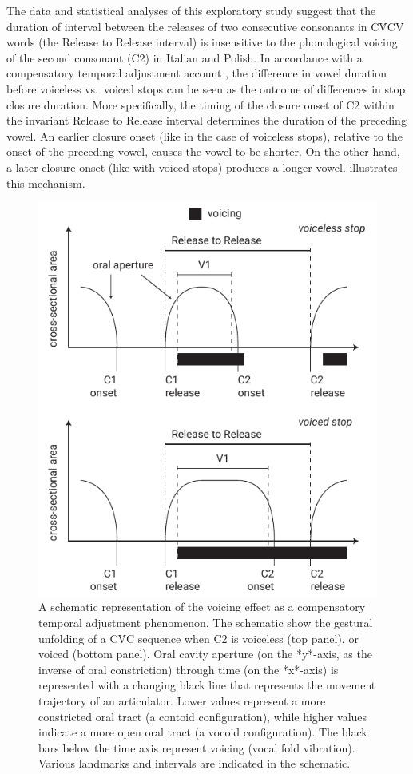 \documentclass[preprint]{JASAnew}
\begin{document}
The data and statistical analyses of this exploratory study suggest that
the duration of interval between the releases of two consecutive
consonants in CV́CV words (the Release to Release interval) is
insensitive to the phonological voicing of the second consonant (C2) in
Italian and Polish. In accordance with a compensatory temporal
adjustment account \citep{slis1969, lehiste1970}, the difference in
vowel duration before voiceless vs.~voiced stops can be seen as the
outcome of differences in stop closure duration. More specifically, the
timing of the closure onset of C2 within the invariant Release to
Release interval determines the duration of the preceding vowel. An
earlier closure onset (like in the case of voiceless stops), relative to
the onset of the preceding vowel, causes the vowel to be shorter. On the
other hand, a later closure onset (like with voiced stops) produces a
longer vowel.  illustrates this mechanism.

\begin{figure}
  \includegraphics{img/compensatory.pdf}
  \caption{A schematic representation of the voicing effect as a compensatory temporal adjustment phenomenon. The schematic show the gestural unfolding of a CV́C sequence when C2 is voiceless (top panel), or voiced (bottom panel). Oral cavity aperture (on the *y*-axis, as the inverse of oral constriction) through time (on the *x*-axis) is represented with a changing black line that represents the movement trajectory of an articulator. Lower values represent a more constricted oral tract (a contoid configuration), while higher values indicate a more open oral tract (a vocoid configuration). The black bars below the time axis represent voicing (vocal fold vibration). Various landmarks and intervals are indicated in the schematic.}
  \label{f:compensatory}
\end{figure}
\end{document}
